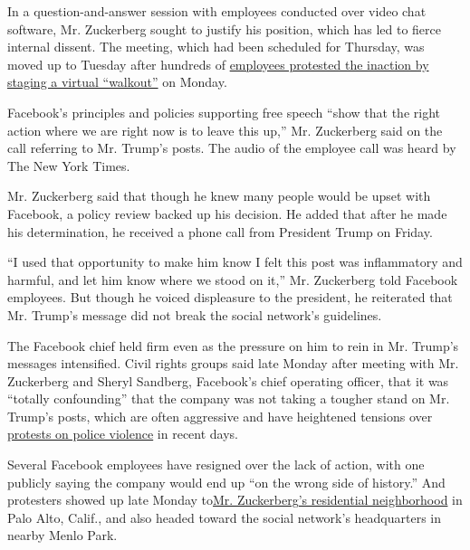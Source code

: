 In a question-and-answer session with employees conducted over video
chat software, Mr. Zuckerberg sought to justify his position, which has
led to fierce internal dissent. The meeting, which had been scheduled
for Thursday, was moved up to Tuesday after hundreds of
\href{https://www.nytimes.com/2020/06/01/technology/facebook-employee-protest-trump.html}{employees
protested the inaction by staging a virtual ``walkout''} on Monday.

Facebook's principles and policies supporting free speech ``show that
the right action where we are right now is to leave this up,'' Mr.
Zuckerberg said on the call referring to Mr. Trump's posts. The audio of
the employee call was heard by The New York Times.

Mr. Zuckerberg said that though he knew many people would be upset with
Facebook, a policy review backed up his decision. He added that after he
made his determination, he received a phone call from President Trump on
Friday.

``I used that opportunity to make him know I felt this post was
inflammatory and harmful, and let him know where we stood on it,'' Mr.
Zuckerberg told Facebook employees. But though he voiced displeasure to
the president, he reiterated that Mr. Trump's message did not break the
social network's guidelines.

The Facebook chief held firm even as the pressure on him to rein in Mr.
Trump's messages intensified. Civil rights groups said late Monday after
meeting with Mr. Zuckerberg and Sheryl Sandberg, Facebook's chief
operating officer, that it was ``totally confounding'' that the company
was not taking a tougher stand on Mr. Trump's posts, which are often
aggressive and have heightened tensions over
\href{https://www.nytimes.com/news-event/george-floyd-protests-minneapolis-new-york-los-angeles?action=click\&pgtype=Article\&state=default\&module=styln-george-floyd\&variant=show\&region=TOP_BANNER\&context=storylines_menu}{protests
on police violence} in recent days.

Several Facebook employees have resigned over the lack of action, with
one publicly saying the company would end up ``on the wrong side of
history.'' And protesters showed up late Monday
to\href{https://padailypost.com/2020/06/02/nighttime-protest-blocked-near-police-station-demonstrators-also-go-to-zuckerbergs-house/}{Mr.
Zuckerberg's residential neighborhood} in Palo Alto, Calif., and also
headed toward the social network's headquarters in nearby Menlo Park.

